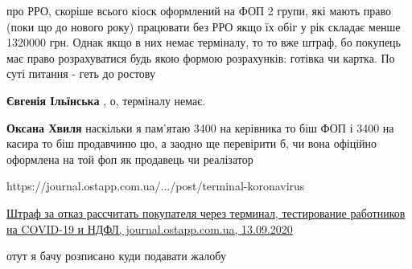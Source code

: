 \begin{itemize}
 

про РРО, скоріше всього кіоск оформлений на ФОП 2 групи, які мають право (поки
що до нового року) працювати без РРО якщо їх обіг у рік складає менше 1320000
грн. Однак якщо в них немає терміналу, то то вже штраф, бо покупець має право
розрахуватися будь якою формою розрахунків: готівка чи картка. По суті питання
- геть до ростову

\begin{itemize}
 
\textbf{Євгенія Ільїнська} , о, терміналу немає.

 
\textbf{Оксана Хвиля} наскільки я пам'ятаю 3400 на керівника то біш ФОП і 3400 на касира то біш продавчиню цю, а заодно ще перевірити б, чи вона офіційно оформлена на той фоп як продавець чи реалізатор

 
https://journal.ostapp.com.ua/.../post/terminal-koronavirus 

\href{https://journal.ostapp.com.ua/articles/post/terminal-koronavirus}{%
Штраф за отказ рассчитать покупателя через терминал, тестирование работников на COVID-19 и НДФЛ, %
journal.ostapp.com.ua, 13.09.2020%
}

отут я бачу розписано куди подавати жалобу

 

\end{itemize}
\end{itemize}
